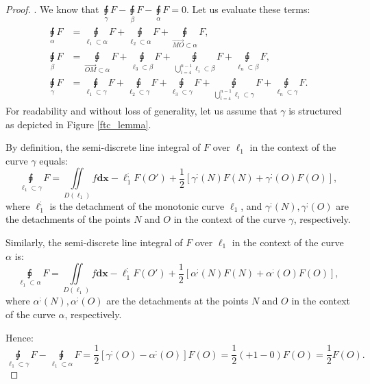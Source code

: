 \documentclass[11pt]{book}
\begin{document}
\begin{proof}. We know that $\underset{\gamma}{\sqint}F-\underset{\beta}{\sqint}F-\underset{\alpha}{\sqint}F=0.$
Let us evaluate these terms:
\begin{align}\label{ftc_lemma_equations}
\begin{aligned}
\underset{\alpha}{\sqint}F & =\underset{\ell_{1}\subset\alpha}{\sqint}F+\underset{\ell_{2}\subset\alpha}{\sqint}F+\underset{\overrightarrow{MO}\subset\alpha}{\sqint}F,\\
\underset{\beta}{\sqint}F & =\underset{\overrightarrow{OM}\subset\alpha}{\sqint}F+\underset{\ell_{3}\subset\beta}{\sqint}F+\underset{\bigcup_{i=4}^{n-1}\ell_{i}\subset\beta}{\sqint}F+\underset{\ell_{n}\subset\beta}{\sqint}F,\\
\underset{\gamma}{\sqint}F & =\underset{\ell_{1}\subset\gamma}{\sqint}F+\underset{\ell_{2}\subset\gamma}{\sqint}F+\underset{\ell_{3}\subset\gamma}{\sqint}F+\underset{\bigcup_{i=4}^{n-1}\ell_{i}\subset\gamma}{\sqint}F+\underset{\ell_{n}\subset\gamma}{\sqint}F.
\end{aligned}
\end{align}
For readability and without loss of generality, let us assume that
$\gamma$ is structured as depicted in Figure \ref{ftc_lemma}.

By definition, the semi-discrete line integral of $F$ over $\ell_{1}$
in the context of the curve $\gamma$ equals:
\[
\underset{\ell_{1}\subset\gamma}{\sqint}F=\underset{D\left(\ell_{1}\right)}{\iint}f\boldsymbol{dx}-\ell_{1}^{;}F\left(O'\right)+\frac{1}{2}\left[\gamma^{;}\left(N\right)F\left(N\right)+\gamma^{;}\left(O\right)F\left(O\right)\right],
\]
where $\ell_{1}^{;}$ is the detachment of the monotonic curve $\ell_{1}$,
and $\gamma^{;}\left(N\right),\gamma^{;}\left(O\right)$ are the detachments
of the points $N$ and $O$ in the context of the curve $\gamma$,
respectively.

Similarly, the semi-discrete line integral of $F$ over $\ell_{1}$ in
the context of the curve $\alpha$ is:
\[
\underset{\ell_{1}\subset\alpha}{\sqint}F=\underset{D\left(\ell_{1}\right)}{\iint}f\boldsymbol{dx}-\ell_{1}^{;}F\left(O'\right)+\frac{1}{2}\left[\alpha^{;}\left(N\right)F\left(N\right)+\alpha^{;}\left(O\right)F\left(O\right)\right],
\]
where $\alpha^{;}\left(N\right),\alpha^{;}\left(O\right)$ are the
detachments at the points $N$ and $O$ in the context of the curve
$\alpha$, respectively.

Hence:
\[
\underset{\ell_{1}\subset\gamma}{\sqint}F-\underset{\ell_{1}\subset\alpha}{\sqint}F=\frac{1}{2}\left[\gamma^{;}\left(O\right)-\alpha^{;}\left(O\right)\right]F\left(O\right)=\frac{1}{2}\left(+1-0\right)F\left(O\right)=\frac{1}{2}F\left(O\right).
\]


\end{proof}
\end{document}
